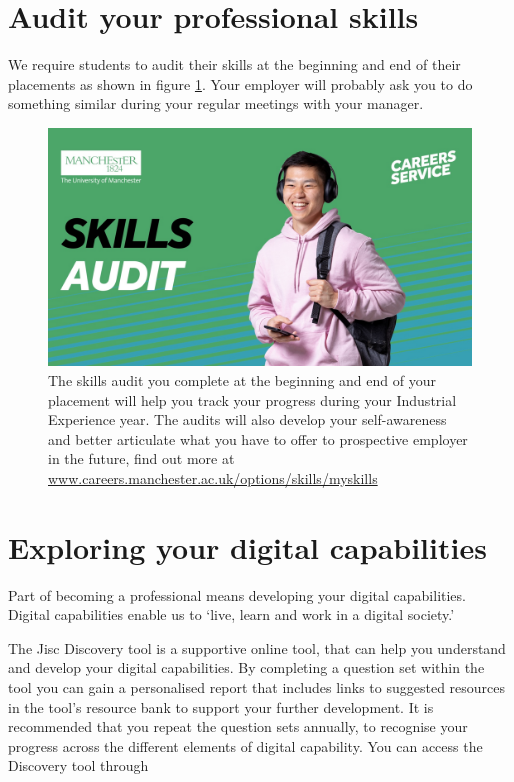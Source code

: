 \documentclass[
]{book}
\begin{document}
\section{Audit your professional skills}\label{audit}

We require students to audit their skills at the beginning and end of their placements as shown in figure \ref{fig:skillsaudit-fig}. Your employer will probably ask you to do something similar during your regular meetings with your manager.

\begin{figure}

{\centering \includegraphics[width=1\linewidth]{images/skills-audit-graphic} 

}

\caption{The skills audit you complete at the beginning and end of your placement will help you track your progress during your Industrial Experience year. The audits will also develop your self-awareness and better articulate what you have to offer to prospective employer in the future, find out more at \href{https://www.careers.manchester.ac.uk/options/skills/myskills/}{www.careers.manchester.ac.uk/options/skills/myskills} \citep{audit}}\label{fig:skillsaudit-fig}
\end{figure}



\section{Exploring your digital capabilities}\label{digital}

Part of becoming a professional means developing your digital capabilities. Digital capabilities enable us to `live, learn and work in a digital society.'

The Jisc Discovery tool is a supportive online tool, that can help you understand and develop your digital capabilities. By completing a question set within the tool you can gain a personalised report that includes
links to suggested resources in the tool's resource bank to support your further development. It is recommended that you repeat the question sets annually, to recognise your progress across the different elements of digital capability. You can access the Discovery tool through
\end{document}
